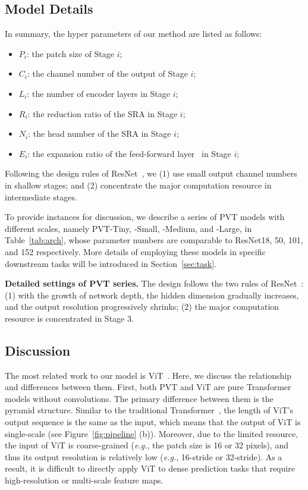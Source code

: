 \documentclass[10pt,twocolumn,letterpaper]{article}
\def\eg{\emph{e.g.}}
\begin{document}
\subsection{Model Details}

In summary, the hyper parameters of our method are listed as follows:
\begin{itemize}
    \item $P_i$: the patch size of Stage $i$;
    \item $C_i$: the channel number of the output of Stage $i$;
    \item $L_i$: the number of encoder layers in Stage $i$;
    \item $R_i$: the reduction ratio of the SRA in Stage $i$;
    \item $N_i$: the head number of the SRA in Stage $i$;
    \item $E_i$: the expansion ratio of the feed-forward layer~\cite{vaswani2017attention} in Stage $i$;
\end{itemize}
Following the design rules of ResNet~\cite{he2016deep}, we (1) use small output channel numbers in shallow stages; and (2) concentrate the major computation resource
in intermediate stages.

To provide instances for discussion, we describe a series of PVT models with different scales, namely PVT-Tiny, -Small, -Medium, and -Large, in Table~\ref{tab:arch}, whose parameter numbers are comparable to ResNet18, 50, 101, and 152 respectively.
%
More details of employing these models in specific downstream tasks will be introduced in Section~\ref{sec:task}.
\begin{table*}[t]
    \centering
    \renewcommand\arraystretch{ 1.0}
    \setlength{\tabcolsep}{1.0mm}
    
    \caption{\textbf{Detailed settings of PVT series.} The design follows the two rules of ResNet~\cite{he2016deep}: (1) with the growth of network depth, the hidden dimension gradually increases, and the output resolution progressively shrinks; (2) the major computation resource is concentrated in Stage 3.
    }
    \label{tab:arch}
\end{table*}



\subsection{Discussion}

The most related work to our model is ViT~\cite{dosovitskiy2020image}. 
Here, we discuss the relationship and differences between them.
%
First, both PVT and ViT are pure Transformer models without convolutions. The primary difference between them is the pyramid structure. 
%
Similar to the traditional Transformer~\cite{vaswani2017attention}, the length of ViT's output sequence is the same as the input, which means that the output of ViT is single-scale (see Figure~\ref{fig:pipeline} (b)).
%
Moreover, due to the limited resource, the input of ViT is coarse-grained (\eg, the patch size is 16 or 32 pixels), and thus its output resolution is relatively low (\eg, 16-stride or 32-stride).
%
As a result, it is difficult to directly apply ViT to dense prediction tasks that require high-resolution or multi-scale feature maps.
\end{document}

